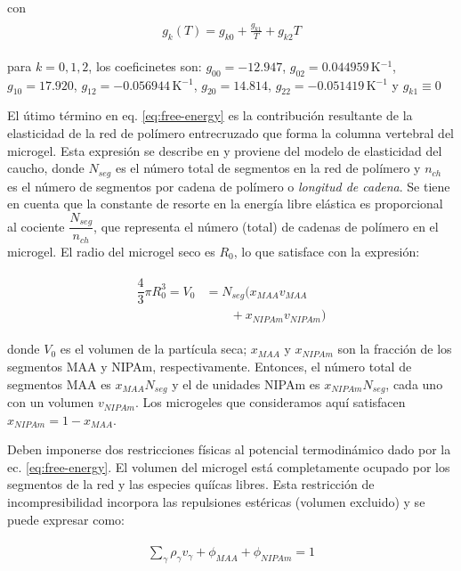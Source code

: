 \noindent con
%
%
\begin{align}
\begin{aligned} 
g_k(T)=g_{k0} + \frac{g_{k1}}{T} + g_{k2}T
\end{aligned}
\end{align}


\noindent para  $k=0,1,2$, los coeficinetes son: $g_{00}= -12.947$, $g_{02}=0.044959\,$K$^{-1}$, $g_{10}= 17.920$, $g_{12}= -0.056944$\,K$^{-1}$, $g_{20}= 14.814$, $g_{22}= -0.051419$\,K$^{-1}$  y $g_{k1}\equiv 0$ \cite{afroze2000}


El \'utimo t\'ermino en eq. \ref{eq:free-energy} es la contribuci\'on resultante de la elasticidad de la red de pol\'imero entrecruzado que forma la columna vertebral del microgel.
Esta expresi\'on se describe en \cite{moncho-jorda2016a} y proviene del modelo de elasticidad del caucho,
donde $N_{seg}$ es el n\'umero total de segmentos en la red de pol\'imero y $n_{ch}$ es el n\'umero de segmentos por cadena de pol\'imero o \emph{longitud de cadena}.
Se tiene en cuenta que la constante de resorte en la energ\'ia libre el\'astica es proporcional al cociente $\dfrac{N_{seg}}{n_{ch}}$, que representa el n\'umero (total) de cadenas de pol\'imero en el microgel.
El radio del microgel seco es $R_0$, lo que satisface con la expresi\'on:

%
%
\begin{align}
\begin{aligned} 
\dfrac{4}{3}\pi R_0^3=V_0&=N_{seg}\Big( x_{MAA} v_{MAA}\\
&\qquad+x_{NIPAm} v_{NIPAm}\Big)
\end{aligned}
\end{align}


\noindent donde $V_0$ es el volumen de la part\'icula seca; $x_{MAA}$ y $x_{NIPAm}$ son la fracci\'on de los segmentos MAA y NIPAm, respectivamente.
Entonces, el n\'umero total de segmentos MAA es $x_{MAA}N_{seg}$ y el de unidades NIPAm es $x_{NIPAm}N_{seg}$, cada uno con un volumen $v_{NIPAm}$.
Los microgeles que consideramos aqu\'i satisfacen $x_{NIPAm}=1-x_{MAA}$.


Deben imponerse dos restricciones f\'isicas al potencial termodin\'amico dado por la ec. \ref{eq:free-energy}.
El volumen del microgel est\'a completamente ocupado por los segmentos de la red y las especies quí\'icas libres.
Esta restricci\'on de incompresibilidad incorpora las repulsiones est\'ericas (volumen excluido) y se puede expresar como:
%

%
%
\begin{align}
\begin{aligned}
\sum_{\gamma } \rho_\gamma v_\gamma  + \phi_{MAA} + \phi_{NIPAm} = 1
\end{aligned}
\label{eq:packing}
\end{align}



